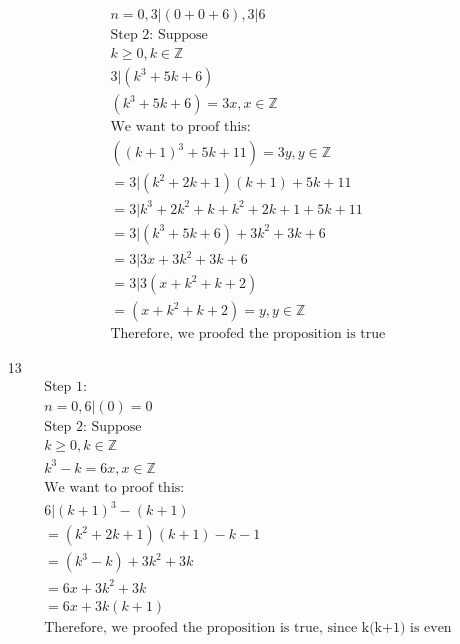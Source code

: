 \documentclass[12pt]{article}
\begin{document}
\begin{enumerate}
\begin{equation*}
\begin{split}
		    n = 0, 3 | (0 + 0 + 6), 3|6\\
		    \text{Step 2: Suppose}\\
		    k \ge 0, k \in \mathbb{Z}\\
		    3|(k^3 + 5k + 6)\\
		    (k^3 + 5k + 6) = 3x, x \in \mathbb{Z}\\
		    \text{We want to proof this:}\\
		    ((k+1)^3 + 5k + 11) = 3y, y \in \mathbb{Z}\\
		    = 3|(k^2 + 2k + 1)(k+1) +5k +11\\
		    = 3|k^3 + 2k^2 + k + k^2 + 2k + 1 +5k +11\\
		    =3|(k^3 +5k + 6) +3k^2 +  3k +6\\
		    =3|3x +3k^2 +  3k +6\\
		    =3|3(x +k^2 + k +2)\\
		    =(x +k^2 + k +2) = y, y \in \mathbb{Z}\\
		    \text{Therefore, we proofed the proposition is true}
	    	\end{split}
	    \end{equation*}
	\item [13] 
	    \begin{equation*}
	    	\begin{split}
		    \text{Step 1:}\\
		    n = 0, 6|(0) = 0\\
		    \text{Step 2: Suppose}\\
		    k \ge 0, k \in \mathbb{Z}\\
		    k^3 - k = 6x, x \in \mathbb{Z}\\
		    \text{We want to proof this:}\\
		    6|(k+1)^3 - (k + 1)\\
		    = (k^2 + 2k + 1)(k+1) -k -1\\
		    = (k^3 -k) +3k^2 + 3k\\
		    = 6x + 3k^2 + 3k\\
		    = 6x + 3k(k+1)\\
		    \text{Therefore, we proofed the proposition is true, since k(k+1) is even}
	    	\end{split}
	    \end{equation*}
\end{enumerate}
\end{document}
